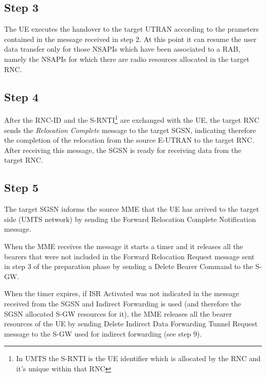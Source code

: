 \subsection*{Step 3}
The UE executes the handover to the target UTRAN according to the prameters
contained in the message received in step 2. At this point it can resume the user
data transfer only for those NSAPIs which have been associated to a RAB, namely
the NSAPIs for which there are radio resources allocated in the target RNC.



\subsection*{Step 4}
After the RNC-ID and the S-RNTI\footnote{In UMTS the S-RNTI is the UE identifier which is allocated
by the RNC and it's unique within that RNC} are exchanged with the UE, the target
RNC sends the \emph{Relocation Complete} message to the target SGSN, indicating
therefore the completion of the relocation from the source E-UTRAN to the target
RNC. After receiving this message, the SGSN is ready for receiving data from
the target RNC.



\subsection*{Step 5}
The target SGSN informs the source MME that the UE has arrived to the target side
(UMTS network) by sending the Forward Relocation Complete Notification message.

When the MME receives the message it starts a timer and it releases all the bearers
that were not included in the Forward Relocation Request message sent in step 3
of the preparation phase by sending a Delete Bearer Command to the S-GW.

When the timer expires, if ISR Activated was not indicated in the message received
from the SGSN and Indirect Forwarding is used (and therefore the SGSN allocated
S-GW resources for it), the MME releases all the bearer resources of the UE by
sending Delete Indirect Data Forwarding Tunnel Request message to the S-GW used
for indirect forwarding (see step 9).



